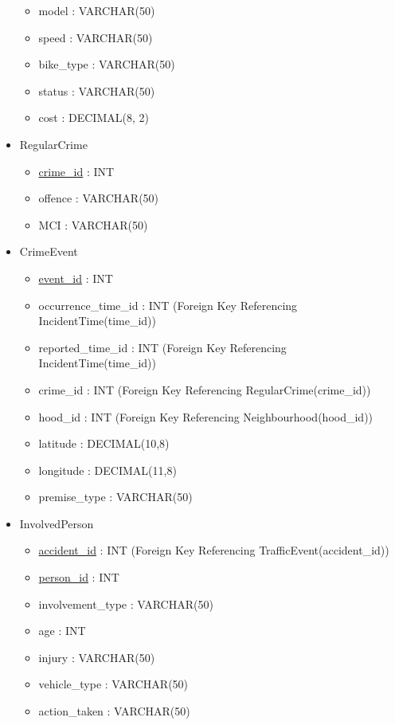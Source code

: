 \documentclass[12pt, a4paper]{article}
\begin{document}
\begin{itemize}
\begin{itemize}
        \item model : VARCHAR(50)
        \item speed : VARCHAR(50)
        \item bike\_type : VARCHAR(50)
        \item status : VARCHAR(50)
        \item cost : DECIMAL(8, 2)
    \end{itemize}
    \item RegularCrime
        \begin{itemize}
        \item \underline{crime\_id} : INT
        \item offence : VARCHAR(50)
        \item MCI : VARCHAR(50)
    \end{itemize}
    \item CrimeEvent
        \begin{itemize}
        \item \underline{event\_id} : INT
        \item occurrence\_time\_id : INT (Foreign Key Referencing IncidentTime(time\_id))
        \item reported\_time\_id : INT (Foreign Key Referencing IncidentTime(time\_id))
        \item crime\_id : INT (Foreign Key Referencing RegularCrime(crime\_id))
        \item hood\_id : INT (Foreign Key Referencing Neighbourhood(hood\_id))
        \item latitude : DECIMAL(10,8)
        \item longitude : DECIMAL(11,8)
        \item premise\_type : VARCHAR(50)
    \end{itemize}
    \item InvolvedPerson
    \begin{itemize}
        \item \underline{accident\_id} : INT (Foreign Key Referencing TrafficEvent(accident\_id))
        \item \underline{person\_id} : INT
        \item involvement\_type : VARCHAR(50)
        \item age : INT
        \item injury : VARCHAR(50)
        \item vehicle\_type : VARCHAR(50)
        \item action\_taken : VARCHAR(50)
    \end{itemize}

\end{itemize}
\end{document}
